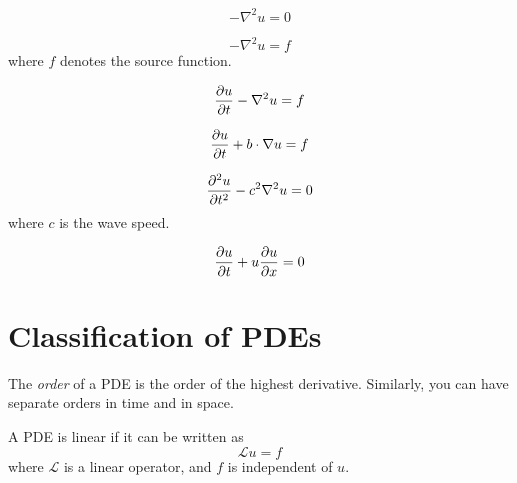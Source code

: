 \documentclass[12pt]{article}
\begin{document}
\begin{ex}
    \begin{equation}
        -\nabla^2u = 0
    \end{equation}
\end{ex}

\begin{ex}
    \begin{equation}
        -\nabla^2u = f
    \end{equation}
    where $f$ denotes the source function.
\end{ex}

\begin{ex}
    \begin{equation}
        \frac{\partial u}{\partial t} - \nabla^2u = f
    \end{equation}
\end{ex}

\begin{ex}
    \begin{equation}
        \frac{\partial u}{\partial t} + b\cdot\nabla u = f
    \end{equation}
\end{ex}

\begin{ex}
    \begin{equation}
        \frac{\partial ^2u}{\partial t^2} - c^2\nabla^2u = 0
    \end{equation}
    where $c$ is the wave speed.
\end{ex}

\begin{ex}
    \begin{equation}
        \frac{\partial u}{\partial t} + u\frac{\partial u}{\partial x} = 0
    \end{equation}
\end{ex}

\section{Classification of PDEs}

\begin{defn}[Order]
    The \emph{order} of a PDE is the order of the highest derivative. Similarly, you can have separate orders in time and in space.
\end{defn}

\begin{defn}[Linearity]
    A PDE is linear if it can be written as
    $$\mathcal Lu = f$$
    where $\mathcal L$ is a linear operator, and $f$ is independent of $u$.
\end{defn}
\end{document}
